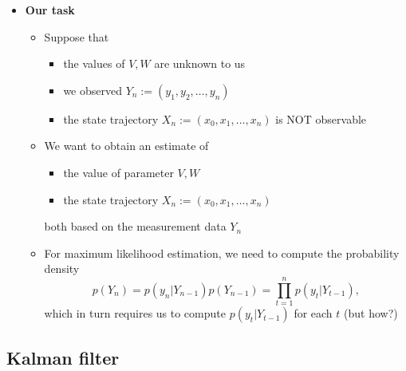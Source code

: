 \documentclass[12pt,a4paper]{article}
\begin{document}
\begin{itemize}
\begin{itemize}
  \end{itemize}

\item \textbf{Our task}

  \begin{itemize}

  \item Suppose that
    \begin{itemize}
    \item the values of $V, W$ are unknown to us
    \item we observed $Y_{n}:=(y_{1},y_{2},\ldots, y_{n})$
    \item the state trajectory $X_{n}:=(x_{0}, x_{1},\ldots, x_{n})$ is NOT observable
    \end{itemize}
  \item We want to obtain an estimate of
    \begin{itemize}
    \item the value of parameter $V, W$
    \item the state trajectory $X_{n}:=(x_{0}, x_{1},\ldots, x_{n})$
    \end{itemize}
    both based on the measurement data $Y_{n}$

  \item For maximum likelihood estimation, we need to compute
    the probability density
    \begin{equation}\label{eq:PYt_0}%
      p(Y_{n})
      = p(y_{n}|Y_{n-1})p(Y_{n-1})
      = \prod_{t=1}^{n}p(y_{t}|Y_{t-1}),
    \end{equation}
    which in turn requires us to compute
    $p(y_{t}|Y_{t-1})$ for each $t$ (but how?)
   
  \end{itemize}

\end{itemize}

\subsection{Kalman filter}
\end{document}
